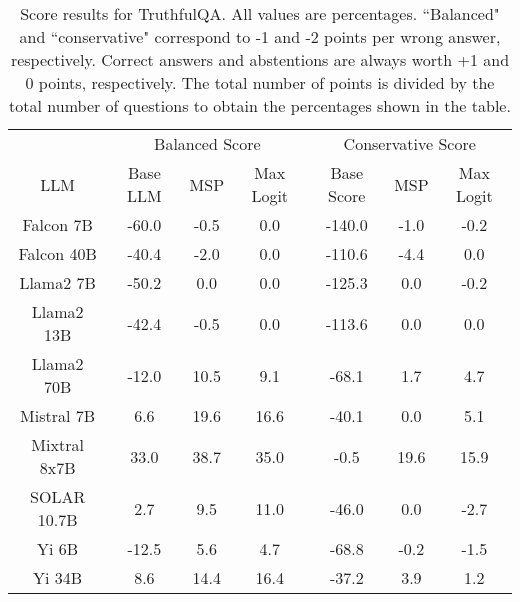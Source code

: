 \renewcommand\arraystretch{1.2}
\begin{table*}
\centering
\begin{tabular}{c|c|c|c|c|c|c}
& \multicolumn{3}{c|}{Balanced Score} & \multicolumn{3}{c}{Conservative Score} \\ 
LLM & Base LLM & MSP & Max Logit & Base Score & MSP & Max Logit\\ \hline
Falcon 7B & -60.0 & -0.5 & 0.0 & -140.0 & -1.0 & -0.2\\
Falcon 40B & -40.4 & -2.0 & 0.0 & -110.6 & -4.4 & 0.0\\
Llama2 7B & -50.2 & 0.0 & 0.0 & -125.3 & 0.0 & -0.2\\
Llama2 13B & -42.4 & -0.5 & 0.0 & -113.6 & 0.0 & 0.0\\
Llama2 70B & -12.0 & 10.5 & 9.1 & -68.1 & 1.7 & 4.7\\
Mistral 7B & 6.6 & 19.6 & 16.6 & -40.1 & 0.0 & 5.1\\
Mixtral 8x7B & 33.0 & 38.7 & 35.0 & -0.5 & 19.6 & 15.9\\
SOLAR 10.7B & 2.7 & 9.5 & 11.0 & -46.0 & 0.0 & -2.7\\
Yi 6B & -12.5 & 5.6 & 4.7 & -68.8 & -0.2 & -1.5\\
Yi 34B & 8.6 & 14.4 & 16.4 & -37.2 & 3.9 & 1.2\\
\hline
\end{tabular}
\caption{Score results for TruthfulQA. All values are percentages. ``Balanced" and ``conservative" correspond to -1 and -2 points per wrong answer, respectively. Correct answers and abstentions are always worth +1 and 0 points, respectively. The total number of points is divided by the total number of questions to obtain the percentages shown in the table.}
\label{tab:truthfulqa_score}
\end{table*}
